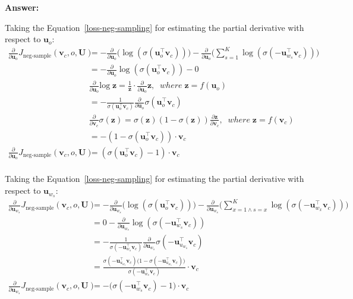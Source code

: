 \documentclass{article}
\newenvironment{answer}{
    {\bf Answer:} \sf \begingroup\color{red}
}{\endgroup}%
\begin{document}
\begin{enumerate}[label=(\alph*)]
\begin{shaded}
\begin{answer}
Taking the Equation~\ref{loss-neg-sampling} for estimating the partial derivative with respect to $\bm u_o$: 
\begin{equation*}
\begin{split}
\frac{\partial}{\partial \bm u_o} J_{\text{neg-sample}}(\bm v_c, o, \bm U) & = -\frac{\partial}{\partial \bm u_o} \Big(\log(\sigma(\bm u_o^\top \bm v_c))\Big) - \frac{\partial}{\partial \bm u_o} \Bigg(\sum_{s=1}^K \log(\sigma(-\bm u_{w_s}^\top \bm v_c))\Bigg)\\
& = -\frac{\partial}{\partial \bm u_o} \log(\sigma(\bm u_o^\top \bm v_c)) - 0\\
& \boxed{ \frac{\partial}{\partial \bm u_o} \text{log} \;\bm z = \frac{1}{\bm z} \cdot \frac{\partial}{\partial \bm u_o} \bm z , \;\; where \; \bm z = f(\bm u_o)}\\
& = -\frac{1}{\sigma(\bm u_o^\top \bm v_c)} \frac{\partial}{\partial \bm u_o} \sigma(\bm u_o^\top \bm v_c)\\
& \boxed{\frac{\partial}{\partial \bm v_c} \sigma (\bm z)= \sigma(\bm z)(1-\sigma(\bm z)) \frac{\partial \bm z}{\partial \bm v_c} , \;\; where \; \bm z = f(\bm v_c)}\\
&  = - (1-\sigma(\bm u_o^\top \bm v_c)) \cdot \bm v_c\\
\frac{\partial}{\partial \bm u_o} J_{\text{neg-sample}}(\bm v_c, o, \bm U) & = \boxed{ (\sigma(\bm u_o^\top \bm v_c) - 1) \cdot \bm v_c}\\
\end{split}
\end{equation*}


Taking the Equation~\ref{loss-neg-sampling} for estimating the partial derivative with respect to $\bm u_{w_s}$: 
\begin{equation*}
\begin{split}
\frac{\partial}{\partial \bm u_{w_s}} J_{\text{neg-sample}}(\bm v_c, o, \bm U) & = -\frac{\partial}{\partial \bm u_{w_s}} \Big(\log(\sigma(\bm u_o^\top \bm v_c))\Big) - \frac{\partial}{\partial \bm u_{w_s}} \Bigg(\sum_{x=1 \wedge s=x}^K \log(\sigma(-\bm u_{w_x}^\top \bm v_c))\Bigg)\\
& = 0 - \frac{\partial}{\partial \bm u_{w_s}} \log(\sigma(-\bm u_{w_s}^\top \bm v_c))\\
& = - \frac{1}{\sigma(-\bm u_{w_s}^\top \bm v_c)} \frac{\partial}{\partial \bm u_{w_s}} \sigma(-\bm u_{u_{w_s}}^\top \bm v_c)\\
& = \frac{\sigma(-\bm u_{u_{w_s}}^\top \bm v_c) \big(1 - \sigma(-\bm u_{u_{w_s}}^\top \bm v_c) \big) }{\sigma(-\bm u_{w_s}^\top \bm v_c)} \cdot \bm v_c\\
\frac{\partial}{\partial \bm u_{w_s}} J_{\text{neg-sample}}(\bm v_c, o, \bm U) & = \boxed{ - \big(\sigma(-\bm u_{w_s}^\top \bm v_c) - 1 \big) \cdot \bm v_c}\\
\end{split}
\end{equation*}


\end{answer}
\end{shaded}
\end{enumerate}
\end{document}
